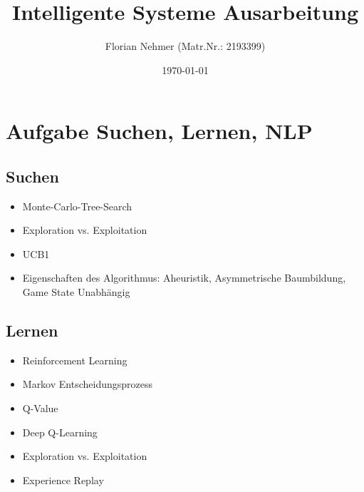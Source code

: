 \documentclass[a4paper, 11pt]{scrartcl}
\title{Intelligente Systeme Ausarbeitung}
\author{Florian Nehmer (Matr.Nr.: 2193399)}
\date{\today}
\begin{document}
\maketitle
\thispagestyle{empty}

\newpage
\tableofcontents
\thispagestyle{empty}

\newpage
{}


\section{Aufgabe Suchen, Lernen, NLP}

\subsection{Suchen}
\begin{itemize}
  \item Monte-Carlo-Tree-Search
  \item Exploration vs. Exploitation
  \item UCB1
  \item Eigenschaften des Algorithmus: Aheuristik, Asymmetrische Baumbildung, Game State Unabhängig
\end{itemize}

\subsection{Lernen}
\begin{itemize}
  \item Reinforcement Learning
  \item Markov Entscheidungsprozess
  \item Q-Value
  \item Deep Q-Learning
  \item Exploration vs. Exploitation
  \item Experience Replay
\end{itemize}
\end{document}
